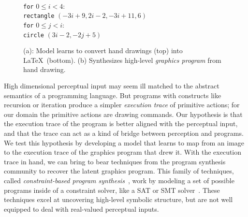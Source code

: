 \documentclass{article}
\begin{document}
\begin{figure}[h]
\begin{minipage}[t]{0.7\linewidth}
\begin{tabular}{llll}
\end{tabular}
\subcaption{}
  \end{minipage}%
  \begin{minipage}[t]{0.3\linewidth}
    \\
    \texttt{for} $0\leq i < 4$:\\
    \texttt{rectangle} $(-3i + 9,2i - 2, -3i + 11,6)$\\
    \texttt{for} $0\leq j < i$:\\
    \texttt{circle} $(3i-2,-2j+5)$\\
    \subcaption{}
  \end{minipage}
  \caption{(a): Model learns to convert hand drawings (top) into \LaTeX~(bottom). (b) Synthesizes high-level \emph{graphics program} from hand drawing.}\label{firstPageExamples}
  \end{figure}

High dimensional perceptual input may seem ill matched to the abstract
semantics of a programming language. But programs with constructs like
recursion or iteration produce a simpler \emph{execution trace} of
primitive actions; for our domain the primitive actions are drawing
commands. Our hypothesis is that the execution trace of the program is
better aligned with the perceptual input, and that the trace can act
as a kind of bridge between perception and programs. We test this
hypothesis by developing a model that learns to map from an image to
the execution trace of the graphics program that drew it.  With the
execution trace in hand, we can bring to bear techniques from the
program synthesis community to recover the latent graphics program.
This family of techniques, called \emph{constraint-based program synthesis}~\cite{solar2008program},
work by modeling a set of possible programs inside of a constraint solver,
like a SAT or SMT solver~\cite{de2008z3}.
These techniques excel at uncovering high-level symbolic structure,
but are not well equipped to deal with real-valued perceptual inputs.
\end{document}
